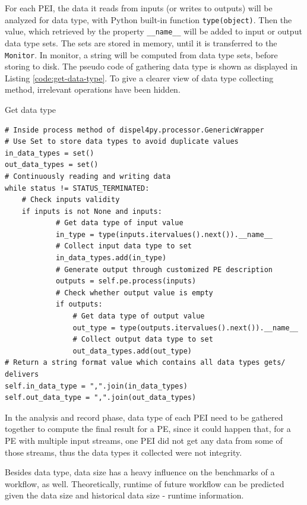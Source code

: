 \documentclass[10pt,twoside,openright,logo]{report}
\begin{document}
For each PEI, the data it reads from inputs (or writes to outputs) will be analyzed for data type, with Python built-in function \texttt{type(object)}. Then the value, which retrieved by the property \texttt{__name__} will be added to input or output data type sets. The sets are stored in memory, until it is transferred to the \texttt{Monitor}. In monitor, a string will be computed from data type sets, before storing to disk.
The pseudo code of gathering data type is shown as displayed in Listing \ref{code:get-data-type}. To give a clearer view of data type collecting method, irrelevant operations have been hidden.

\begin{listing}
\caption{Get data type}
\label{code:get-data-type}
\begin{verbatim}
# Inside process method of dispel4py.processor.GenericWrapper
# Use Set to store data types to avoid duplicate values
in_data_types = set()
out_data_types = set()
# Continuously reading and writing data
while status != STATUS_TERMINATED:
    # Check inputs validity
    if inputs is not None and inputs:
            # Get data type of input value
            in_type = type(inputs.itervalues().next()).__name__
            # Collect input data type to set
            in_data_types.add(in_type)
            # Generate output through customized PE description
            outputs = self.pe.process(inputs)
            # Check whether output value is empty
            if outputs:
                # Get data type of output value
                out_type = type(outputs.itervalues().next()).__name__
                # Collect output data type to set
                out_data_types.add(out_type)
# Return a string format value which contains all data types gets/ delivers
self.in_data_type = ",".join(in_data_types)
self.out_data_type = ",".join(out_data_types)
\end{verbatim}
\end{listing}

In the analysis and record phase, data type of each PEI need to be gathered together to compute the final result for a PE, since it could happen that, for a PE with multiple input streams, one PEI did not get any data from some of those streams, thus the data types it collected were not integrity.

Besides data type, data size has a heavy influence on the benchmarks of a workflow, as well. Theoretically, runtime of future workflow can be predicted given the data size and historical data size - runtime information.
\end{document}
